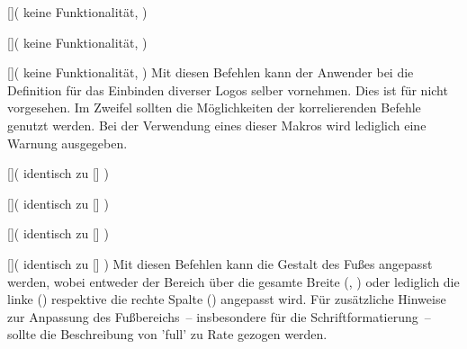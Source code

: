 \begin{Bundle*}{}
\begin{Declaration}{[]}(%
  keine Funktionalität, 
)
\begin{Declaration}{[]}(%
  keine Funktionalität, 
)
\begin{Declaration}{[]}(%
  keine Funktionalität, %
)
\printdeclarationlist%
%
Mit diesen Befehlen kann der Anwender bei  die Definition 
für das Einbinden diverser Logos selber vornehmen. Dies ist für \TUDScript 
nicht vorgesehen. Im Zweifel sollten die Möglichkeiten der korrelierenden 
Befehle genutzt werden. Bei der Verwendung eines dieser Makros wird lediglich 
eine Warnung ausgegeben.
\end{Declaration}
\end{Declaration}
\end{Declaration}

\begin{Declaration}{[]}(%
  identisch zu []
)
\begin{Declaration}{[]}(%
  identisch zu []
)
\begin{Declaration}{[]}(%
  identisch zu [\POParameter{*}]
)
\begin{Declaration}{[]}(%
  identisch zu [\PParameter{*}]
)
\printdeclarationlist%
%
Mit diesen Befehlen kann die Gestalt des Fußes angepasst werden, wobei entweder 
der Bereich über die gesamte Breite (, ) 
oder lediglich die linke () respektive die rechte Spalte 
() angepasst wird. Für zusätzliche Hinweise zur Anpassung 
des Fußbereichs~-- insbesondere für die Schriftformatierung~-- sollte die 
Beschreibung von 'full' zu Rate gezogen werden.
\end{Declaration}
\end{Declaration}
\end{Declaration}
\end{Declaration}


\end{Bundle*}
